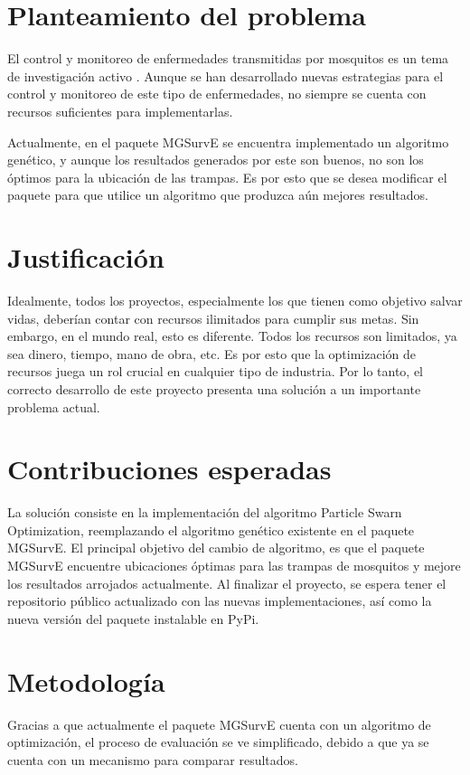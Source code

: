 \documentclass[letterpaper, 10pt, conference]{ieeeconf}
\begin{document}
\section{Planteamiento del problema}
El control y monitoreo de enfermedades transmitidas por mosquitos es un tema de investigación activo \cite{AltStrategies}. Aunque se han desarrollado nuevas estrategias para el control y monitoreo de este tipo de enfermedades, no siempre se cuenta con recursos suficientes para implementarlas.

Actualmente, en el paquete MGSurvE se encuentra implementado un algoritmo genético, y aunque los resultados generados por este son buenos, no son los óptimos para la ubicación de las trampas. Es por esto que se desea modificar el paquete para que utilice un algoritmo que produzca aún mejores resultados. 

\section{Justificación}
Idealmente, todos los proyectos, especialmente los que tienen como objetivo salvar vidas, deberían contar con recursos ilimitados para cumplir sus metas. Sin embargo, en el mundo real, esto es diferente. Todos los recursos son limitados, ya sea dinero, tiempo, mano de obra, etc. Es por esto que la optimización de recursos juega un rol crucial en cualquier tipo de industria. Por lo tanto, el correcto desarrollo de este proyecto presenta una solución a un importante problema actual.

\section{Contribuciones esperadas}
La solución consiste en la implementación del algoritmo Particle Swarn Optimization, reemplazando el algoritmo genético existente en el paquete MGSurvE. El principal objetivo del cambio de algoritmo, es que el paquete MGSurvE encuentre ubicaciones óptimas para las trampas de mosquitos y mejore los resultados arrojados actualmente. Al finalizar el proyecto, se espera tener el repositorio público actualizado con las nuevas implementaciones, así como la nueva versión del paquete instalable en PyPi.

\section{Metodología}
Gracias a que actualmente el paquete MGSurvE cuenta con un algoritmo de optimización, el proceso de evaluación se ve simplificado, debido a que ya se cuenta con un mecanismo para comparar resultados.
\end{document}
